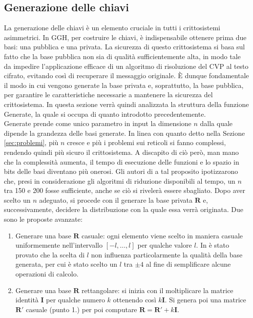 \subsection{Generazione delle chiavi}
La generazione delle chiavi è un elemento cruciale in tutti i crittosistemi asimmetrici. 
In GGH, per costruire le chiavi, è indispensabile ottenere prima due basi: una 
pubblica e una privata. La sicurezza di questo crittosistema si basa sul fatto che la base pubblica 
non sia di qualità sufficientemente alta, in modo tale da impedire l'applicazione efficace 
di un algoritmo di risoluzione del CVP al testo cifrato, 
evitando così di recuperare il messaggio originale. È dunque fondamentale il modo in cui 
vengono generate la base privata e, soprattutto, la base pubblica, per garantire le 
caratteristiche necessarie a mantenere la sicurezza del crittosistema.
In questa sezione verrà quindi analizzata la struttura della funzione Generate, la quale si
occupa di quanto introdotto precedentemente. 
\\
Generate prende come unico parametro in input la dimensione $n$ dalla quale dipende la
grandezza delle basi generate. In linea con quanto detto nella Sezione \ref{sec:problemi}, 
più $n$ cresce e più i problemi sui reticoli si fanno complessi, rendendo quindi più sicuro
il crittosistema. A discapito di ciò però,
man mano che la complessità aumenta, il tempo di esecuzione delle funzioni e lo spazio in
bits delle basi diventano più onerosi. Gli autori di \cite[Sezione 3.3.1]{GGH97} a tal proposito ipotizzarono
che, presi in considerazione gli algoritmi di riduzione disponibili al tempo, un $n$ tra 150 e 200 fosse
sufficiente, anche se ciò si rivelerà essere sbagliato. 
Dopo aver scelto un $n$ adeguato, si procede con il generare la base privata $\mathbf{R}$
e, successivamente, decidere la distribuzione con la quale essa verrà originata. 
Due sono le proposte avanzate:
\begin{enumerate}
    \item Generare una base $\mathbf{R}$ casuale: ogni elemento viene scelto in maniera casuale
    uniformemente nell'intervallo $[-l,\dots,l]$ per qualche valore $l$. In \cite{GGH97}
    è stato provato che la scelta di $l$ non influenza particolarmente la qualità della base
    generata, per cui è stato scelto un $l$ tra $\pm4$ al fine di semplificare alcune operazioni
    di calcolo.
    \item Generare una base $\mathbf{R}$ rettangolare: si inizia con il moltiplicare la matrice identità
    $\mathbf{I}$ per qualche numero $k$ ottenendo così $k\mathbf{I}$. 
    Si genera poi una matrice $\mathbf{R}'$ casuale (punto 1.) per poi computare
    $\mathbf{R} = \mathbf{R}' + k\mathbf{I}$.
\end{enumerate}

